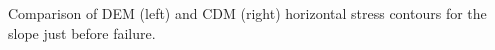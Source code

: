 \label{fig:S12DNS} Comparison of DEM (left) and CDM (right) horizontal stress contours for the slope just before failure.  